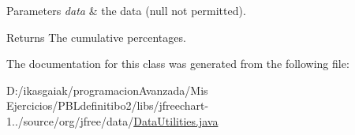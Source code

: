 \begin{DoxyParams}{Parameters}
{\em data} & the data ({\ttfamily null} not permitted).\\
\hline
\end{DoxyParams}
\begin{DoxyReturn}{Returns}
The cumulative percentages. 
\end{DoxyReturn}


The documentation for this class was generated from the following file\+:\begin{DoxyCompactItemize}
\item 
D\+:/ikasgaiak/programacion\+Avanzada/\+Mis Ejercicios/\+P\+B\+Ldefinitibo2/libs/jfreechart-\/1../source/org/jfree/data/\mbox{\hyperlink{_data_utilities_8java}{Data\+Utilities.\+java}}\end{DoxyCompactItemize}
